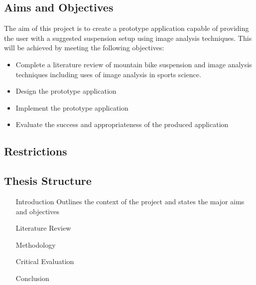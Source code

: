 \subsection{Aims and Objectives}
	The aim of this project is to create a prototype application capable of providing the user with a suggested suspension setup using image analysis techniques. This will be achieved by meeting the following objectives:
	\begin{itemize}
		\item Complete a literature review of mountain bike suspension and image analysis techniques including uses of image analysis in sports science.
		\item Design the prototype application
		\item Implement the prototype application 
		\item Evaluate the success and appropriateness of the produced application 
	\end{itemize}
\subsection{Restrictions}
\subsection{Thesis Structure}
\begin{itemize}
	\item[Introduction] Outlines the context of the project and states the major aims and objectives
	\item[Literature Review] 
	\item[Methodology]
	\item[Critical Evaluation] 
	\item[Conclusion]
\end{itemize}
	